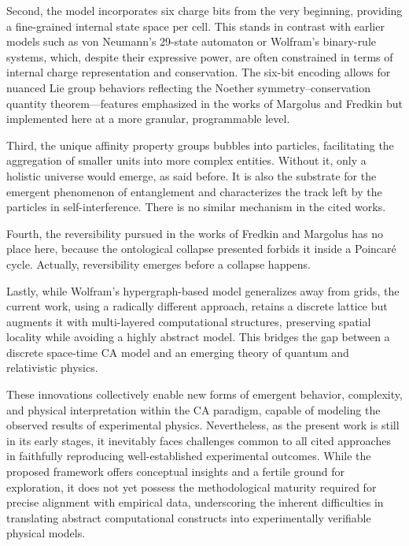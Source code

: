 \documentclass[12pt,english]{article}
\begin{document}
Second, the model incorporates six charge bits from the very beginning, providing a fine-grained internal state space per cell. This stands in contrast with earlier models such as von Neumann’s 29-state automaton or Wolfram’s binary-rule systems, which, despite their expressive power, are often constrained in terms of internal charge representation and conservation. The six-bit encoding allows for nuanced Lie group behaviors reflecting the Noether symmetry–conservation quantity theorem—features emphasized in the works of Margolus and Fredkin but implemented here at a more granular, programmable level.

Third, the unique affinity property groups bubbles into particles, facilitating the aggregation of smaller units into more complex entities. Without it, only a holistic universe would emerge, as said before. It is also the substrate for the emergent phenomenon of entanglement and characterizes the track left by the particles in self-interference. There is no similar mechanism in the cited works.

Fourth, the reversibility pursued in the works of Fredkin and Margolus has no place here, because the ontological collapse presented forbids it inside a Poincaré cycle. Actually, reversibility emerges before a collapse happens.

Lastly, while Wolfram’s hypergraph-based model generalizes away from grids, the current work, using a radically different approach, retains a discrete lattice but augments it with multi-layered computational structures, preserving spatial locality while avoiding a highly abstract model. This bridges the gap between a discrete space-time CA model and an emerging theory of quantum and relativistic physics.

These innovations collectively enable new forms of emergent behavior, complexity, and physical interpretation within the CA paradigm, capable of modeling the observed results of experimental physics. Nevertheless, as the present work is still in its early stages, it inevitably faces challenges common to all cited approaches in faithfully reproducing well-established experimental outcomes. While the proposed framework offers conceptual insights and a fertile ground for exploration, it does not yet possess the methodological maturity required for precise alignment with empirical data, underscoring the inherent difficulties in translating abstract computational constructs into experimentally verifiable physical models.
\end{document}
